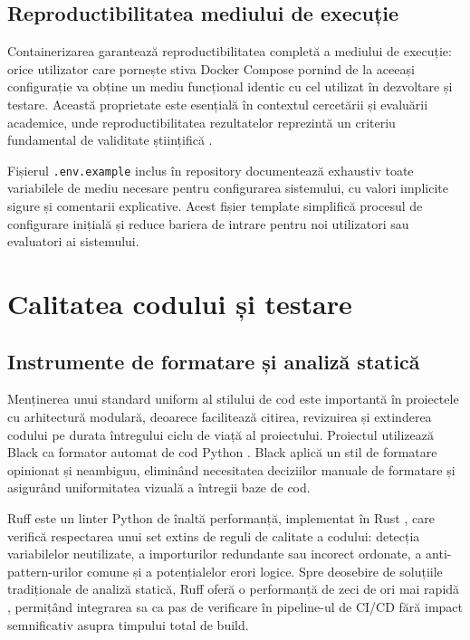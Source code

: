 \documentclass[12pt, a4paper, oneside, romanian]{teza-upb}
\begin{document}
\subsection{Reproductibilitatea mediului de execuție}

Containerizarea garantează reproductibilitatea completă a mediului de execuție: orice utilizator care pornește stiva Docker Compose pornind de la aceeași configurație va obține un mediu funcțional identic cu cel utilizat în dezvoltare și testare. Această proprietate este esențială în contextul cercetării și evaluării academice, unde reproductibilitatea rezultatelor reprezintă un criteriu fundamental de validitate științifică \cite{goodfellow2016}.

Fișierul \texttt{.env.example} inclus în repository documentează exhaustiv toate variabilele de mediu necesare pentru configurarea sistemului, cu valori implicite sigure și comentarii explicative. Acest fișier template simplifică procesul de configurare inițială și reduce bariera de intrare pentru noi utilizatori sau evaluatori ai sistemului.

\section{Calitatea codului și testare}

\subsection{Instrumente de formatare și analiză statică}

Menținerea unui standard uniform al stilului de cod este importantă în proiectele cu arhitectură modulară, deoarece facilitează citirea, revizuirea și extinderea codului pe durata întregului ciclu de viață al proiectului. Proiectul utilizează Black ca formator automat de cod Python \cite{black_doc}. Black aplică un stil de formatare opinionat și neambiguu, eliminând necesitatea deciziilor manuale de formatare și asigurând uniformitatea vizuală a întregii baze de cod.

Ruff este un linter Python de înaltă performanță, implementat în Rust \cite{ruff_doc}, care verifică respectarea unui set extins de reguli de calitate a codului: detecția variabilelor neutilizate, a importurilor redundante sau incorect ordonate, a anti-pattern-urilor comune și a potențialelor erori logice. Spre deosebire de soluțiile tradiționale de analiză statică, Ruff oferă o performanță de zeci de ori mai rapidă \cite{ruff_doc}, permițând integrarea sa ca pas de verificare în pipeline-ul de CI/CD fără impact semnificativ asupra timpului total de build.
\end{document}
